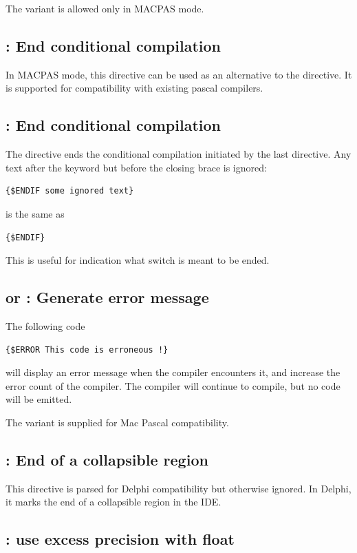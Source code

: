 The  variant is allowed only in MACPAS mode.

\subsection{ : End conditional compilation}
In MACPAS mode, this directive can be used as an alternative to the
 directive. It is supported for compatibility with existing \macos pascal
compilers.

\subsection{ : End conditional compilation}

The  directive ends the conditional compilation initiated by the
last  directive. Any text after the  keyword but
before the closing brace is ignored:
\begin{verbatim}
{$ENDIF some ignored text}
\end{verbatim}
is the same as
\begin{verbatim}
{$ENDIF}
\end{verbatim}
This is useful for indication what switch is meant to be ended.

\subsection{ or  : Generate error message}

The following code
\begin{verbatim}
{$ERROR This code is erroneous !}
\end{verbatim}
will display an error message when the compiler encounters it,
and increase the error count of the compiler.
The compiler will continue to compile, but no code will be emitted.

The  variant is supplied for Mac Pascal compatibility.

\subsection{: End of a collapsible region}
This directive is parsed for Delphi compatibility but otherwise ignored. 
In Delphi, it marks the end of a collapsible region in the IDE.

\subsection{: use excess precision with float}

